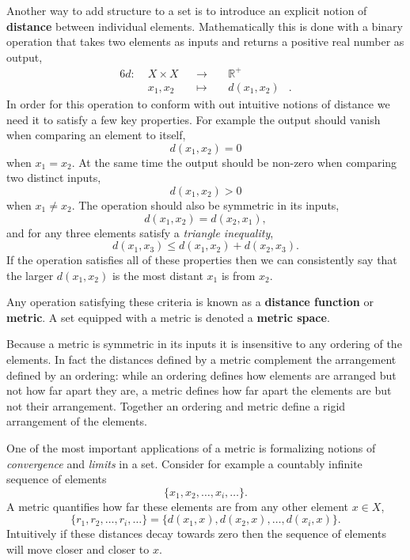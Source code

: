 \documentclass[
  letterpaper,
  DIV=11,
  numbers=noendperiod]{scrartcl}
\begin{document}
Another way to add structure to a set is to introduce an explicit notion
of \textbf{distance} between individual elements. Mathematically this is
done with a binary operation that takes two elements as inputs and
returns a positive real number as output, \begin{alignat*}{6}
d :\; & X \times X& &\rightarrow& \; & \mathbb{R}^{+} &
\\
& x_{1}, x_{2} & &\mapsto& & d(x_{1}, x_{2}) &.
\end{alignat*} In order for this operation to conform with out intuitive
notions of distance we need it to satisfy a few key properties. For
example the output should vanish when comparing an element to itself, \[
d(x_{1}, x_{2}) = 0
\] when \(x_{1} = x_{2}\). At the same time the output should be
non-zero when comparing two distinct inputs, \[
d(x_{1}, x_{2}) > 0
\] when \(x_{1} \ne x_{2}\). The operation should also be symmetric in
its inputs, \[
d(x_{1}, x_{2}) = d(x_{2}, x_{1}),
\] and for any three elements satisfy a \emph{triangle inequality}, \[
d(x_{1}, x_{3}) \le d(x_{1}, x_{2}) + d(x_{2}, x_{3}).
\] If the operation satisfies all of these properties then we can
consistently say that the larger \(d(x_{1}, x_{2})\) is the most distant
\(x_{1}\) is from \(x_{2}\).

Any operation satisfying these criteria is known as a \textbf{distance
function} or \textbf{metric}. A set equipped with a metric is denoted a
\textbf{metric space}.

Because a metric is symmetric in its inputs it is insensitive to any
ordering of the elements. In fact the distances defined by a metric
complement the arrangement defined by an ordering: while an ordering
defines how elements are arranged but not how far apart they are, a
metric defines how far apart the elements are but not their arrangement.
Together an ordering and metric define a rigid arrangement of the
elements.

One of the most important applications of a metric is formalizing
notions of \emph{convergence} and \emph{limits} in a set. Consider for
example a countably infinite sequence of elements \[
\{ x_{1}, x_{2}, \ldots, x_{i}, \ldots \}.
\] A metric quantifies how far these elements are from any other element
\(x \in X\), \[
\{ r_{1}, r_{2}, \ldots, r_{i}, \ldots \}
=
\{ d(x_{1}, x), d(x_{2}, x), \ldots, d(x_{i}, x) \}.
\] Intuitively if these distances decay towards zero then the sequence
of elements will move closer and closer to \(x\).
\end{document}
